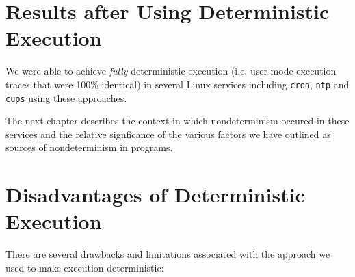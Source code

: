 \section{Results after Using Deterministic Execution} \label{ch3:data}
We were able to achieve {\em fully} deterministic execution (i.e.
user-mode execution traces that were 100\% identical) in several
Linux services including \texttt{cron}, \texttt{ntp} and
\texttt{cups} using these approaches.

The next chapter describes the context in which nondeterminism
occured in these services and the relative signficance of the various factors we have outlined 
as sources of nondeterminism in programs.

\section{Disadvantages of Deterministic Execution} \label{ch3:issues}
There are several drawbacks and limitations associated with the approach we used
to make execution deterministic:

